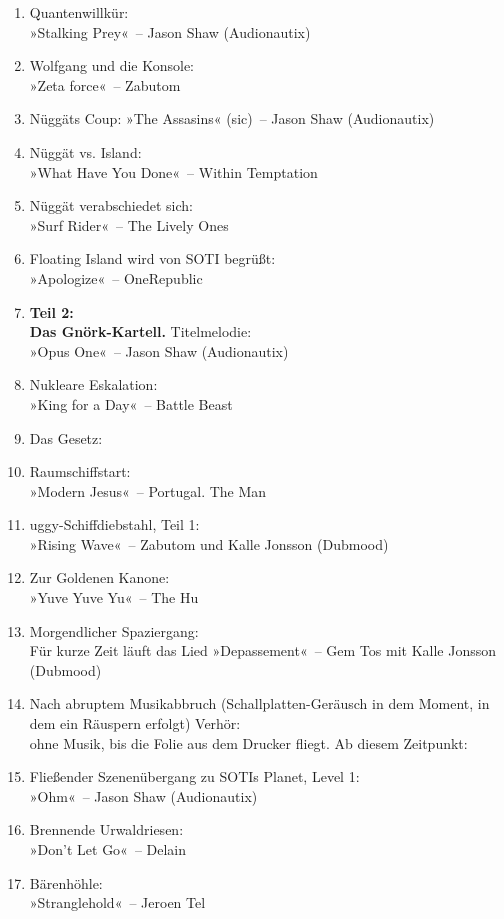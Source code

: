 \begin{enumerate}
    \item Quantenwillkür:\\ »Stalking Prey«~– Jason Shaw (Audionautix)
    \item Wolfgang und die Konsole:\\ »Zeta force«~– Zabutom
    \item Nüggäts Coup: »The Assasins« (sic)~– Jason Shaw (Audionautix)
    \item Nüggät vs. Island:\\ »What Have You Done«~– Within Temptation
    \item Nüggät verabschiedet sich:\\ »Surf Rider«~– The Lively Ones
    \item Floating Island wird von SOTI begrüßt:\\ »Apologize«~– OneRepublic
    \item \textbf{Teil 2:\\ Das Gnörk-Kartell.} Titelmelodie:\\ »Opus One«~– Jason Shaw (Audionautix)
    \item Nukleare Eskalation:\\ »King for a Day«~– Battle Beast
    \item Das Gesetz:
    \item Raumschiffstart:\\ »Modern Jesus«~– Portugal. The Man
    \item uggy-Schiffdiebstahl, Teil 1:\\ »Rising Wave«~– Zabutom und Kalle Jonsson (Dubmood)
    \item Zur Goldenen Kanone:\\ »Yuve Yuve Yu«~– The Hu
    \item Morgendlicher Spaziergang:\\ Für kurze Zeit läuft das Lied »Depassement«~– Gem Tos mit Kalle Jonsson (Dubmood)
    \item Nach abruptem Musikabbruch (Schallplatten-Geräusch in dem Moment, in dem ein Räuspern erfolgt) Verhör:\\ ohne Musik, bis die Folie aus dem Drucker fliegt. Ab diesem Zeitpunkt:
    \item Fließender Szenenübergang zu SOTIs Planet, Level 1:\\ »Ohm«~– Jason Shaw (Audionautix)
    \item Brennende Urwaldriesen:\\ »Don’t Let Go«~– Delain
    \item Bärenhöhle:\\ »Stranglehold«~– Jeroen Tel

\end{enumerate}
